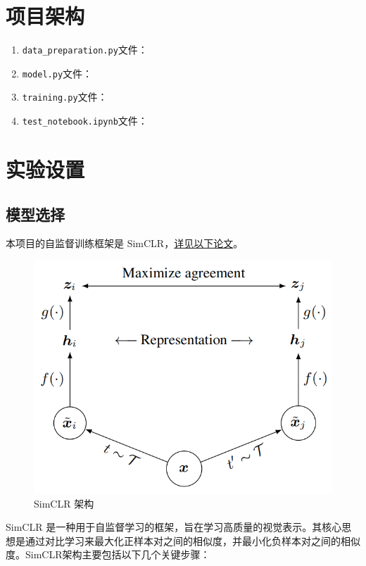 \documentclass[notitlepage,cs4size,punct,oneside]{ctexrep}
\numberwithin{equation}{chapter}
\theoremstyle{mystyle}
\begin{document}
\section{项目架构}
\begin{enumerate}
    \item \texttt{data\_preparation.py}文件：
    \item \texttt{model.py}文件：
    \item \texttt{training.py}文件：
    \item \texttt{test\_notebook.ipynb}文件：
    \end{enumerate}

\section{实验设置}
\subsection{模型选择}
本项目的自监督训练框架是 SimCLR，\href{http://proceedings.mlr.press/v119/chen20j/chen20j.pdf}{详见以下论文}。
\begin{figure}[H]
    \centering
    \includegraphics[scale=0.6]{simclr.png}
    \caption{SimCLR 架构}
\end{figure}
SimCLR 是一种用于自监督学习的框架，旨在学习高质量的视觉表示。其核心思想是通过对比学习来最大化正样本对之间的相似度，并最小化负样本对之间的相似度。SimCLR架构主要包括以下几个关键步骤：
\end{document}
